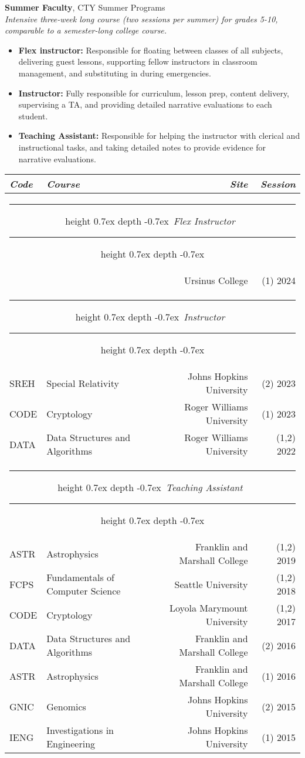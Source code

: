 \documentclass[marginmode, 10pt]{res} %
\def\Vhrulefill{\leavevmode\leaders\hrule height 0.7ex depth \dimexpr0.4pt-0.7ex\hfill\kern0pt}         %
\begin{document}
\begin{resume}
\textbf{Summer Faculty}, CTY Summer Programs \\
\textit{Intensive three-week long course (two sessions per summer) for grades 5-10, comparable to a semester-long college course.}
\begin{itemize}
    \item \textbf{Flex instructor:} Responsible for floating between classes of all subjects, delivering guest lessons, supporting fellow instructors in classroom management, and substituting in during emergencies.
    \item \textbf{Instructor:} Fully responsible for curriculum, lesson prep, content delivery, supervising a TA, and providing detailed narrative evaluations to each student.
    \item \textbf{Teaching Assistant:} Responsible for helping the instructor with clerical and instructional tasks, and taking detailed notes to provide evidence for narrative evaluations.
\end{itemize}
\begin{tabular*}{\textwidth}{ll@{\extracolsep{\fill}}rr}
    \textit{Code} & \textit{Course} & \textit{Site} & \textit{Session} \\
    \hline
    \multicolumn{4}{c}{\Vhrulefill ~\textit{Flex Instructor}~ \Vhrulefill} \\
    & & Ursinus College & (1) 2024 \\
    \multicolumn{4}{c}{\Vhrulefill ~\textit{Instructor}~ \Vhrulefill} \\
    SREH & Special Relativity & Johns Hopkins University & (2) 2023 \\
    CODE & Cryptology & Roger Williams University & (1) 2023 \\
    DATA & Data Structures and Algorithms & Roger Williams University & (1,2) 2022 \\
    \multicolumn{4}{c}{\Vhrulefill ~\textit{Teaching Assistant}~ \Vhrulefill} \\
    ASTR & Astrophysics & Franklin and Marshall College & (1,2) 2019 \\
    FCPS & Fundamentals of Computer Science & Seattle University & (1,2) 2018 \\
    CODE & Cryptology & Loyola Marymount University & (1,2) 2017 \\
    DATA & Data Structures and Algorithms & Franklin and Marshall College & (2) 2016 \\
    ASTR & Astrophysics & Franklin and Marshall College & (1) 2016 \\
    GNIC & Genomics & Johns Hopkins University & (2) 2015 \\
    IENG & Investigations in Engineering & Johns Hopkins University & (1) 2015
\end{tabular*}


\end{resume}
\end{document}
